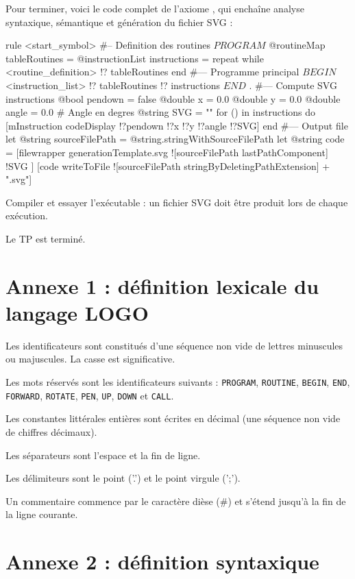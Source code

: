 Pour terminer, voici le code complet de l’axiome , qui enchaîne analyse syntaxique, sémantique et génération du fichier SVG :
\begin{galgascode}
rule <start_symbol> {
#-- Definition des routines
  $PROGRAM$
  @routineMap tableRoutines = {}
  @instructionList instructions = {}
  repeat
  while
    <routine_definition> !? tableRoutines
  end
#--- Programme principal
  $BEGIN$
  <instruction_list> !? tableRoutines !? instructions
  $END$
  $.$
#--- Compute SVG instructions
  @bool pendown = false
  @double x = 0.0
  @double y = 0.0
  @double angle = 0.0 # Angle en degres
  @string SVG = ""
  for () in instructions do
    [mInstruction codeDisplay !?pendown !?x !?y !?angle !?SVG]
  end
#--- Output file
  let @string sourceFilePath = @string.stringWithSourceFilePath
  let @string code = [filewrapper generationTemplate.svg
    ![sourceFilePath lastPathComponent]
    !SVG
  ]
  [code writeToFile ![sourceFilePath stringByDeletingPathExtension] + ".svg"]
}
\end{galgascode}

Compiler et essayer l'exécutable : un fichier SVG doit être produit lors de chaque exécution.

Le TP est terminé.

\section{Annexe 1 : définition lexicale du langage LOGO}

Les identificateurs sont constitués d'une séquence non vide de lettres minuscules ou majuscules. La casse est significative.

Les mots réservés sont les identificateurs suivants : \texttt{PROGRAM}, \texttt{ROUTINE}, \texttt{BEGIN}, \texttt{END}, \texttt{FORWARD}, \texttt{ROTATE}, \texttt{PEN}, \texttt{UP}, \texttt{DOWN} et \texttt{CALL}.

Les constantes littérales entières sont écrites en décimal (une séquence non vide de chiffres décimaux).

Les séparateurs sont l'espace et la fin de ligne.

Les délimiteurs sont le point ('.') et le point virgule (';').

Un commentaire commence par le caractère dièse (\#) et s'étend jusqu'à la fin de la ligne courante.


\section {Annexe 2 : définition syntaxique}

